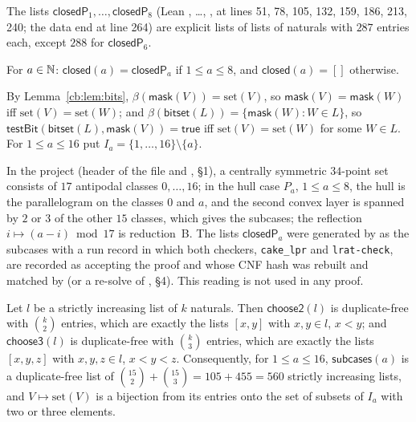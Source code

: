 \begin{definition}\label{cb:def:closedP}
The lists $\mathsf{closedP}_1,\dots,\mathsf{closedP}_8$ (Lean , \dots, , at lines 51,
78, 105, 132, 159, 186, 213, 240; the data end at line 264) are explicit lists of lists of naturals with $287$ entries
each, except $288$ for $\mathsf{closedP}_6$.
\end{definition}

\begin{definition}\label{cb:def:closed}
For $a\in\mathbb N$: $\mathsf{closed}(a)=\mathsf{closedP}_a$ if $1\le a\le8$, and $\mathsf{closed}(a)=[]$ otherwise.
\end{definition}

By Lemma~\ref{cb:lem:bits}, $\beta(\mathsf{mask}(V))=\mathrm{set}(V)$, so $\mathsf{mask}(V)=\mathsf{mask}(W)$ iff
$\mathrm{set}(V)=\mathrm{set}(W)$; and $\beta(\mathsf{bitset}(L))=\{\mathsf{mask}(W):W\in L\}$, so
$\mathsf{testBit}(\mathsf{bitset}(L),\mathsf{mask}(V))=\mathsf{true}$ iff $\mathrm{set}(V)=\mathrm{set}(W)$ for some
$W\in L$. For $1\le a\le16$ put $I_a=\{1,\dots,16\}\setminus\{a\}$.

\begin{remark}\label{cb:rem:c2-reading}
In the project (header of the file and , \S1), a centrally symmetric $34$-point set consists of
$17$ antipodal classes $0,\dots,16$; in the hull case $P_a$, $1\le a\le8$, the hull is the parallelogram on the classes
$0$ and $a$, and the second convex layer is spanned by $2$ or $3$ of the other $15$ classes, which gives the subcases;
the reflection $i\mapsto(a-i)\bmod17$ is reduction~B. The lists $\mathsf{closedP}_a$ were generated by
 as the subcases with a run record in which both checkers, \texttt{cake\_lpr} and
\texttt{lrat-check}, are recorded as accepting the proof and whose CNF hash was
rebuilt and matched by  (or a re-solve of , \S4). This reading is not
used in any proof.
\end{remark}

\begin{lemma}\label{cb:lem:c2-subsets}
Let $l$ be a strictly increasing list of $k$ naturals. Then $\mathsf{choose2}(l)$ is duplicate-free with $\binom k2$
entries, which are exactly the lists $[x,y]$ with $x,y\in l$, $x<y$; and $\mathsf{choose3}(l)$ is duplicate-free with
$\binom k3$ entries, which are exactly the lists $[x,y,z]$ with $x,y,z\in l$, $x<y<z$. Consequently, for
$1\le a\le16$, $\mathsf{subcases}(a)$ is a duplicate-free list of $\binom{15}2+\binom{15}3=105+455=560$ strictly
increasing lists, and $V\mapsto\mathrm{set}(V)$ is a bijection from its entries onto the set of subsets of $I_a$ with
two or three elements.
\end{lemma}

